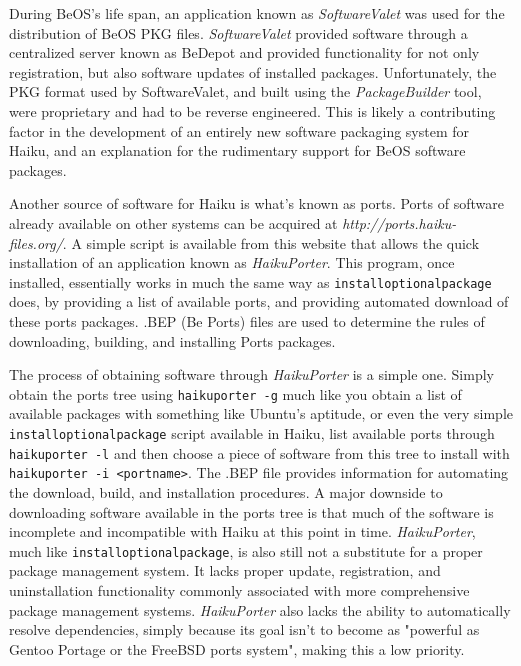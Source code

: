 \documentclass{article}
\begin{document}
During BeOS's life span, an application known
as \textit{SoftwareValet} was used for the distribution of BeOS PKG
files. \textit{SoftwareValet} provided software through a centralized
server known as BeDepot\cite{SoftwareValet} and provided functionality
for not only registration, but also software updates of installed
packages. Unfortunately, the PKG format used by SoftwareValet, and
built using the \textit{PackageBuilder} tool, were proprietary and had
to be reverse engineered.\cite{OpeningPkgFiles} This is likely a
contributing factor in the development of an entirely new software
packaging system for Haiku, and an explanation for the rudimentary
support for BeOS software packages.

Another source of software for Haiku is what's known as ports. Ports
of software already available on other systems can be acquired
at \textit{http://ports.haiku-files.org/}. A simple script is
available from this website that allows the quick installation of an
application known as \textit{HaikuPorter}. This program, once
installed, essentially works in much the same way
as \texttt{installoptionalpackage} does, by providing a list of
available ports, and providing automated download of these ports
packages. .BEP (Be Ports) files are used to determine the rules of
downloading, building, and installing Ports packages.\cite{BepFiles}

The process of obtaining software through \textit{HaikuPorter} is a
simple one. Simply obtain the ports tree using \texttt{haikuporter -g}
much like you obtain a list of available packages with something like
Ubuntu's aptitude, or even the very
simple \texttt{installoptionalpackage} script available in Haiku, list
available ports through \texttt{haikuporter -l} and then choose a
piece of software from this tree to install with \texttt{haikuporter
-i <portname>}. The .BEP file provides information for automating the
download, build, and installation procedures.\cite{BepFiles} A major
downside to downloading software available in the ports tree is that
much of the software is incomplete and incompatible with Haiku at this
point in time. \textit{HaikuPorter}, much
like \texttt{installoptionalpackage}, is also still not a substitute
for a proper package management system. It lacks proper update,
registration, and uninstallation functionality commonly associated
with more comprehensive package management
systems. \textit{HaikuPorter} also lacks the ability to automatically
resolve dependencies, simply because its goal isn't to become as
"powerful as Gentoo Portage or the FreeBSD ports system", making this
a low priority.\cite{HaikuPorter}
\end{document}
